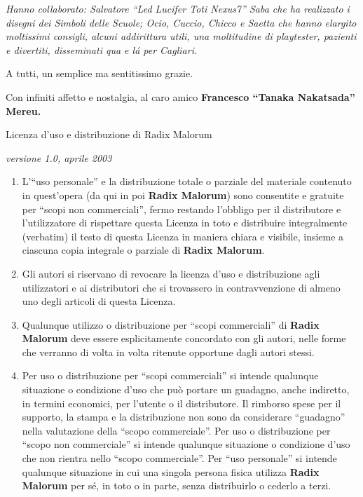 \documentclass[10pt,italian,twocolumn,twoside,xdvi,openany,a4paper]{book}
\begin{document}
\begin{titlepage}
\begin{center}
    \vskip 16cm
    \begin{minipage}[c]{16cm}\it
      \small Hanno collaborato: Salvatore ``Led Lucifer Toti Nexus7'' Saba che ha realizzato i disegni
      dei Simboli delle Scuole; Ocio, Cuccio, Chicco e Saetta che hanno elargito
      moltissimi consigli, alcuni addirittura utili, una moltitudine di playtester, pazienti e divertiti,
      disseminati qua e l\'a per Cagliari. 

      \bigskip
      A tutti, un semplice ma sentitissimo grazie.

      \bigskip
      Con infiniti affetto e nostalgia, al caro amico \textbf{Francesco ``Tanaka Nakatsada'' Mereu.}

      \vskip 6cm

      {\large Licenza d'uso e distribuzione di Radix Malorum}

      \textit{versione 1.0, aprile 2003}
\footnotesize

      \begin{enumerate} \item L'``uso personale'' e la distribuzione
      totale o parziale del materiale contenuto in quest'opera (da qui
      in poi {\bf Radix Malorum}) sono consentite e gratuite per
      ``scopi non commerciali'', fermo restando l'obbligo per il
      distributore e l'utilizzatore di rispettare questa Licenza in
      toto e distribuire integralmente ({\rm verbatim}) il testo di
      questa Licenza in maniera chiara e visibile, insieme a ciascuna
      copia integrale o parziale di {\bf Radix Malorum}.

      \item Gli autori si riservano di revocare la licenza d'uso e
      distribuzione agli utilizzatori e ai distributori che si
      trovassero in contravvenzione di almeno uno degli articoli di
      questa Licenza.

      \item Qualunque utilizzo o distribuzione per ``scopi
      commerciali'' di {\bf Radix Malorum} deve essere esplicitamente
      concordato con gli autori, nelle forme che verranno di volta in
      volta ritenute opportune dagli autori stessi.

      \item Per uso o distribuzione per ``scopi commerciali'' si
      intende qualunque situazione o condizione d'uso che pu\`o
      portare un guadagno, anche indiretto, in termini economici, per
      l'utente o il distributore. Il rimborso spese per il supporto,
      la stampa e la distribuzione non sono da considerare
      ``guadagno'' nella valutazione della ``scopo commerciale''. Per
      uso o distribuzione per ``scopo non commerciale'' si intende
      qualunque situazione o condizione d'uso che non rientra nello
      ``scopo commerciale''. Per ``uso personale'' si intende
      qualunque situazione in cui una singola persona fisica utilizza
      {\bf Radix Malorum} per s\'e, in toto o in parte, senza
      distribuirlo o cederlo a terzi.


\end{enumerate}
\end{minipage}
\end{center}
\end{titlepage}
\end{document}

